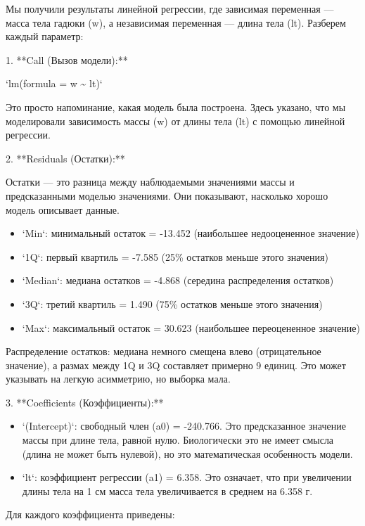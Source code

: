 \documentclass[
  letterpaper,
  DIV=11,
  numbers=noendperiod]{scrreprt}
\begin{document}
Мы получили результаты линейной регрессии, где зависимая переменная ---
масса тела гадюки (w), а независимая переменная --- длина тела (lt).
Разберем каждый параметр:

1. **Call (Вызов модели):**

`lm(formula = w \textasciitilde{} lt)`

Это просто напоминание, какая модель была построена. Здесь указано, что
мы моделировали зависимость массы (w) от длины тела (lt) с помощью
линейной регрессии.

2. **Residuals (Остатки):**

Остатки --- это разница между наблюдаемыми значениями массы и
предсказанными моделью значениями. Они показывают, насколько хорошо
модель описывает данные.

\begin{itemize}
\item
  `Min`: минимальный остаток = -13.452 (наибольшее недооцененное
  значение)
\item
  `1Q`: первый квартиль = -7.585 (25\% остатков меньше этого значения)
\item
  `Median`: медиана остатков = -4.868 (середина распределения остатков)
\item
  `3Q`: третий квартиль = 1.490 (75\% остатков меньше этого значения)
\item
  `Max`: максимальный остаток = 30.623 (наибольшее переоцененное
  значение)
\end{itemize}

Распределение остатков: медиана немного смещена влево (отрицательное
значение), а размах между 1Q и 3Q составляет примерно 9 единиц. Это
может указывать на легкую асимметрию, но выборка мала.

3. **Coefficients (Коэффициенты):**

\begin{itemize}
\item
  `(Intercept)`: свободный член (a0) = -240.766. Это предсказанное
  значение массы при длине тела, равной нулю. Биологически это не имеет
  смысла (длина не может быть нулевой), но это математическая
  особенность модели.
\item
  `lt`: коэффициент регрессии (a1) = 6.358. Это означает, что при
  увеличении длины тела на 1 см масса тела увеличивается в среднем на
  6.358 г.
\end{itemize}

Для каждого коэффициента приведены:
\end{document}
